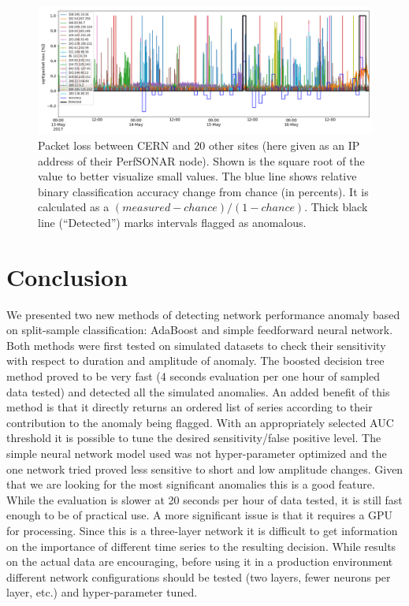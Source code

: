 \documentclass[5p]{elsarticle}
\begin{document}
\begin{figure}[htbp]
    \centering
    \includegraphics[width=\linewidth]{nn_all.png}
    \caption{Packet loss between CERN and 20 other sites (here given as an IP address of their PerfSONAR node). Shown is the square root of the value to better visualize small values. The blue line shows relative binary classification accuracy change from chance (in percents). It is calculated as a $(measured - chance)/ (1-chance)$. Thick black line (“Detected”) marks intervals flagged as anomalous.}
    \label{fig:nn_all}
\end{figure}


\section{Conclusion}

We presented two new methods of detecting network performance anomaly based on split-sample classification: AdaBoost and simple feedforward neural network. Both methods were first tested on simulated datasets to check their sensitivity with respect to duration and amplitude of anomaly. The boosted decision tree method proved to be very fast (4 seconds evaluation per one hour of sampled data tested) and detected all the simulated anomalies. An added benefit of this method is that it directly returns an ordered list of series according to their contribution to the anomaly being flagged. With an appropriately selected AUC threshold it is possible to tune the desired sensitivity/false positive level. 
The simple neural network model used was not hyper-parameter optimized and the one network tried proved less sensitive to short and low amplitude changes. Given that we are looking for the most significant anomalies this is a good feature. While the evaluation is slower at 20 seconds per hour of data tested, it is still fast enough to be of practical use. A more significant issue is that it requires a GPU for processing. Since this is a three-layer network it is difficult to get information on the importance of different time series to the resulting decision. While results on the actual data are encouraging, before using it in a production environment different network configurations should be tested (two layers, fewer neurons per layer, etc.) and hyper-parameter tuned.  
\end{document}
